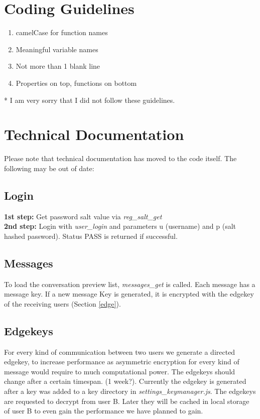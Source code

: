 \documentclass{scrartcl}
\begin{document}
\section{Coding Guidelines}
\begin{enumerate}
\item camelCase for function names
\item Meaningful variable names
\item Not more than 1 blank line
\item Properties on top, functions on bottom
\end{enumerate}
* I am very sorry that I did not follow these guidelines.
  \section{Technical Documentation}
  Please note that technical documentation has moved to the code itself. The following may be out of date:
\subsection{Login}
\textbf{ 1st step:} Get password salt value via \textit{reg\_salt\_get}\\
\textbf{2nd step:} Login with \textit{user\_login} and parameters u (username) and p (salt hashed password). Status PASS is returned if successful.

\subsection{Messages}
To load the conversation preview list, \textit{messages\_get} is called. Each message has a message key. If a new message Key is generated, it is encrypted with the edgekey of the receiving users (Section \ref{edge}).

\subsection{Edgekeys\label{edge}}
For every kind of communication between two users we generate a directed edgekey, to increase performance as asymmetric encryption for every kind of message would require to much computational power.
The edgekeys should change after a certain timespan. (1 week?). Currently the edgekey is generated after a key was added to a key directory in \textit{settings\_keymanager.js}. The edgekeys are requested to decrypt from user B. Later they will be cached in local storage of user B to even gain the performance we have planned to gain.
\end{document}
